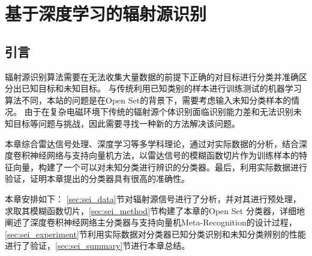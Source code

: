 
\chapter{基于深度学习的辐射源识别}
\label{sec:sei}




\section{引言}
辐射源识别算法需要在无法收集大量数据的前提下正确的对目标进行分类并准确区分出已知目标和未知目标。
与传统利用已知类别的样本进行训练测试的机器学习算法不同，本站的问题是在Open Set的背景下，需要考虑输入未知分类样本的情况。
由于在复杂电磁环境下传统的辐射源个体识别面临识别能力差和无法识别未知目标等问题与挑战，因此需要寻找一种新的方法解决该问题。

本章综合雷达信号处理、深度学习等多学科理论，通过对实际数据的分析，结合深度卷积神经网络与支持向量机方法，以雷达信号的模糊函数切片作为训练样本的特征向量，构建了一个可以对未知分类进行辨识的分类器。最后，利用实际数据进行验证，证明本章提出的分类器具有很高的准确性。

本章安排如下： \ref{sec:sei_data}节对辐射源信号进行了分析，并对其进行预处理，求取其模糊函数切片，\ref{sec:sei_method}节构建了本章的Open Set 分类器，详细地阐述了深度卷积神经网络主分类器与支持向量机Meta-Recognition的设计过程，\ref{sec:sei_experiment}节利用实际数据对分类器已知分类识别和未知分类辨别的性能进行了验证，\ref{sec:sei_summary}节进行本章总结。

